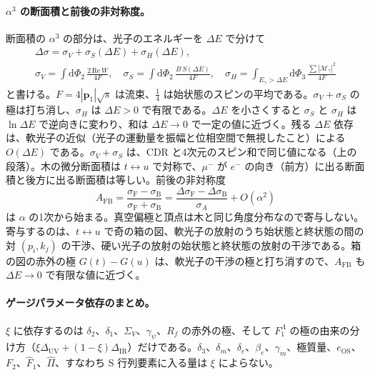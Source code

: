 \documentclass[a4paper,10pt]{ltjsarticle}
\newcommand{\dd}{\mathrm{d}}
\newcommand{\DUV}{\Delta_{\mathrm{UV}}}
\newcommand{\DIR}{\Delta_{\mathrm{IR}}}
\begin{document}
\paragraph{$\alpha^3$ の断面積と前後の非対称度。}断面積の $\alpha^3$ の部分は、光子のエネルギーを $\Delta E$ で分けて
\begin{equation}
\begin{gathered}
\Delta\sigma=\sigma_V+\sigma_S(\Delta E)+\sigma_H(\Delta E),\\
\sigma_V=\int\!\dd\Phi_2\,\frac{2\,\mathrm{Re}\,W}{4F},\quad
\sigma_S=\int\!\dd\Phi_2\,\frac{B\,S(\Delta E)}{4F},\quad
\sigma_H=\int_{E_\gamma>\Delta E}\!\dd\Phi_3\,\frac{\sum|\mathcal M_\gamma|^2}{4F}
\end{gathered}
\label{eq:xsec}
\end{equation}
と書ける。$F=4|\boldsymbol p_1|\sqrt s$ は流束、$\frac14$ は始状態のスピンの平均である。$\sigma_V+\sigma_S$ の極は打ち消し、$\sigma_H$ は $\Delta E>0$ で有限である。$\Delta E$ を小さくすると $\sigma_S$ と $\sigma_H$ は $\ln\Delta E$ で逆向きに変わり、和は $\Delta E\to0$ で一定の値に近づく。残る $\Delta E$ 依存は、軟光子の近似（光子の運動量を振幅と位相空間で無視したこと）による $O(\Delta E)$ である。$\sigma_V+\sigma_S$ は、CDR と4次元のスピン和で同じ値になる（上の段落）。木の微分断面積は $t\leftrightarrow u$ で対称で、$\mu^-$ が $e^-$ の向き（前方）に出る断面積と後方に出る断面積は等しい。前後の非対称度
\begin{equation}
A_{\mathrm{FB}}=\frac{\sigma_{\mathrm F}-\sigma_{\mathrm B}}{\sigma_{\mathrm F}+\sigma_{\mathrm B}}=\frac{\Delta\sigma_{\mathrm F}-\Delta\sigma_{\mathrm B}}{\sigma_A}+O(\alpha^2)
\label{eq:afb}
\end{equation}
は $\alpha$ の1次から始まる。真空偏極と頂点は木と同じ角度分布なので寄与しない。寄与するのは、$t\leftrightarrow u$ で奇の箱の図、軟光子の放射のうち始状態と終状態の間の対 $(p_i,k_j)$ の干渉、硬い光子の放射の始状態と終状態の放射の干渉である。箱の図の赤外の極 $G(t)-G(u)$ は、軟光子の干渉の極と打ち消すので、$A_{\mathrm{FB}}$ も $\Delta E\to0$ で有限な値に近づく。

\paragraph{ゲージパラメータ依存のまとめ。}$\xi$ に依存するのは $\delta_2$、$\delta_1$、$\Sigma_V$、$\gamma_\psi$、$R_f$ の赤外の極、そして $F_1^\Lambda$ の極の由来の分け方（$\xi\DUV+(1-\xi)\DIR$）だけである。$\delta_3$、$\delta_m$、$\delta_e$、$\beta_e$、$\gamma_m$、極質量、$e_{\mathrm{OS}}$、$F_2$、$\hat F_1$、$\hat\Pi$、すなわち S 行列要素に入る量は $\xi$ によらない。
\end{document}
